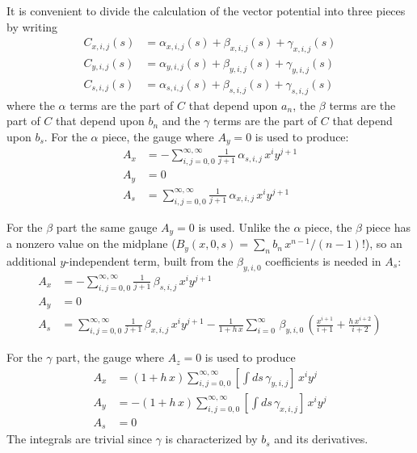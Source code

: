 \documentclass[11pt]{article}
\begin{document}
It is convenient to divide the calculation of the vector potential into three pieces by writing
\begin{align}
  C_{x,i,j}(s) &= \alpha_{x,i,j}(s) + \beta_{x,i,j}(s) + \gamma_{x,i,j}(s) \\
  C_{y,i,j}(s) &= \alpha_{y,i,j}(s) + \beta_{y,i,j}(s) + \gamma_{y,i,j}(s) \\
  C_{s,i,j}(s) &= \alpha_{s,i,j}(s) + \beta_{s,i,j}(s) + \gamma_{s,i,j}(s)
\end{align}
where the $\alpha$ terms are the part of $C$ that depend upon $a_n$, the $\beta$ terms
are the part of $C$ that depend upon $b_n$ and the $\gamma$ terms are the part of $C$
that depend upon $b_s$. For the $\alpha$ piece, the gauge where $A_y = 0$ is used to produce:
\begin{align}
  A_x &= -\sum_{i,j = 0,0}^{\infty,\infty} \frac{1}{j+1} \, \alpha_{s,i,j} \, x^{i} y^{j+1} \\
  A_y &= 0 \\
  A_s &=  \sum_{i,j = 0,0}^{\infty,\infty} \frac{1}{j+1} \, \alpha_{x,i,j} \, x^{i} y^{j+1}
\end{align}

For the $\beta$ part the same gauge $A_y = 0$ is used. Unlike the $\alpha$ piece, the $\beta$
piece has a nonzero value on the midplane ($B_y(x,0,s) = \sum_n b_n\,x^{n-1}/(n-1)!$), so an
additional $y$-independent term, built from the $\beta_{y,i,0}$ coefficients is needed
in $A_s$:
\begin{align}
  A_x &= -\sum_{i,j = 0,0}^{\infty,\infty} \frac{1}{j+1} \, \beta_{s,i,j} \, x^{i} y^{j+1} \\
  A_y &= 0 \\
  A_s &=  \sum_{i,j = 0,0}^{\infty,\infty} \frac{1}{j+1} \, \beta_{x,i,j} \, x^{i} y^{j+1}
       - \frac{1}{1 + h \, x} \sum_{i = 0}^{\infty} \, \beta_{y,i,0} \, \left(
         \frac{x^{i+1}}{i+1} + \frac{h \, x^{i+2}}{i+2} \right)
\end{align}

For the $\gamma$ part, the gauge where $A_z = 0$ is used to produce
\begin{align}
  A_x &=  (1 + h \, x) \sum_{i,j = 0,0}^{\infty,\infty} \left[ \int ds \, \gamma_{y,i,j} \right] \, 
          x^{i} y^{j} \\
  A_y &= -(1 + h \, x) \sum_{i,j = 0,0}^{\infty,\infty} \left[ \int ds \, \gamma_{x,i,j} \right] \, 
          x^{i} y^j \\
  A_s &= 0
\end{align}
The integrals are trivial since $\gamma$ is characterized by $b_s$ and its derivatives.

\printbibliography
\end{document}
